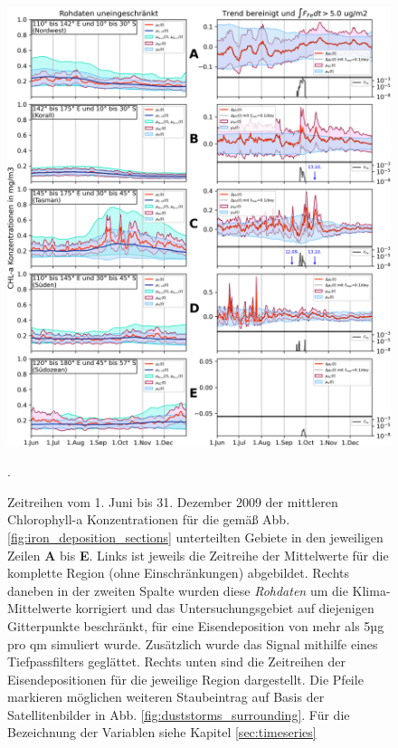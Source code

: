 \documentclass[12pt,a4paper,onecolumn,headheight=30pt]{scrartcl}
\begin{document}
\begin{figure}[htbp]
\includegraphics[width=\textwidth]{bilder/timeseries_all.png}
\caption{Zeitreihen vom 1. Juni bis 31. Dezember 2009 der mittleren Chlorophyll-a Konzentrationen für die gemäß Abb. \ref{fig:iron_deposition_sections} unterteilten Gebiete in den jeweiligen Zeilen \textbf{A} bis \textbf{E}. Links ist jeweils die Zeitreihe der Mittelwerte für die komplette Region (ohne Einschränkungen) abgebildet. Rechts daneben in der zweiten Spalte wurden diese \textit{Rohdaten} um die Klima-Mittelwerte korrigiert und das Untersuchungsgebiet auf diejenigen Gitterpunkte beschränkt, für eine Eisendeposition von mehr als 5µg pro qm simuliert wurde. Zusätzlich wurde das Signal mithilfe eines Tiefpassfilters geglättet. Rechts unten sind die Zeitreihen der Eisendepositionen für die jeweilige Region dargestellt. Die Pfeile markieren möglichen weiteren Staubeintrag auf Basis der Satellitenbilder in Abb. \ref{fig:duststorms_surrounding}. Für die Bezeichnung der Variablen siehe Kapitel \ref{sec:timeseries}}. \label{fig:timeseries_full}
\end{figure}
\end{document}
